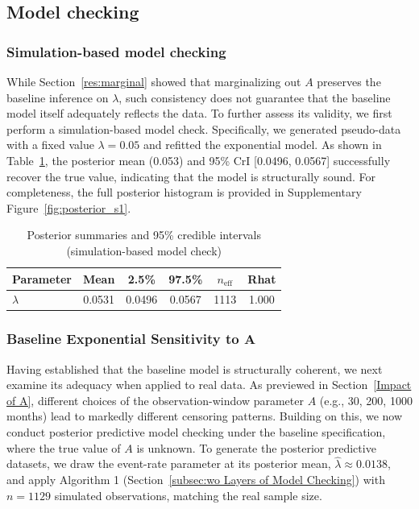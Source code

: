 \subsection{Model checking}
\label{res: model checking}
\subsubsection{Simulation-based model checking}
While Section~\ref{res:marginal} showed that marginalizing out $A$ preserves the baseline inference on $\lambda$, such consistency does not guarantee that the baseline model itself adequately reflects the data. To further assess its validity, we first perform a simulation-based model check. Specifically, we generated pseudo-data with a fixed value $\lambda=0.05$ and refitted the exponential model. As shown in Table~\ref{tab:post-ci}, the posterior mean (0.053) and 95\% CrI [0.0496, 0.0567] successfully recover the true value, indicating that the model is structurally sound. For completeness, the full posterior histogram is provided in Supplementary Figure~\ref{fig:posterior_s1}.
\begin{table}[H]
\centering
\caption{{\small Posterior summaries and 95\% credible intervals (simulation-based model check)}}
\label{tab:post-ci}
\small
\begin{tabular}{lccccc}
\toprule
{Parameter} & {Mean} & {2.5\%} & {97.5\%} & {$n_{\text{eff}}$} & {Rhat} \\
\midrule
$\lambda$   & 0.0531 & 0.0496 & 0.0567 & 1113 & 1.000 \\
\bottomrule
\end{tabular}
\end{table}
\subsubsection{Baseline Exponential Sensitivity to A}
\label{res:baseline_ecdf}
Having established that the baseline model is structurally coherent, we next examine its adequacy when applied to real data. As previewed in Section~\ref{Impact of A}, different choices of the observation-window parameter $A$ (e.g., 30, 200, 1000 months) lead to markedly different censoring patterns. Building on this, we now conduct posterior predictive model checking under the baseline specification, where the true value of $A$ is unknown. To generate the posterior predictive datasets, we draw the event-rate parameter at its posterior mean, $\hat{\lambda} \approx 0.0138$, and apply Algorithm 1 (Section~\ref{subsec:wo Layers of Model Checking}) with $n=1129$ simulated observations, matching the real sample size.

